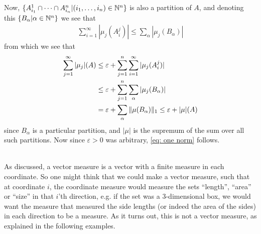 Now, $\{ A_{i_{1}}^{1} \cap \dots \cap A_{i_{n}}^{n} | (i_{1}, \dots, i_{n}) \in \N^{n} \}$ is also a partition of $A$, and denoting this $\{ B_{\alpha} | \alpha \in \N^{n} \}$ we see that
\begin{align*}
	\sum_{i=1}^{\infty} | \mu_{j} (A_{i}^{j}) | \le \sum_{\alpha} | \mu_{j} (B_{\alpha}) |
\end{align*}
from which we see that
\begin{align*}
	\sum_{j=1}^{\infty} |\mu_{j} | (A) &\le \varepsilon +  \sum_{j=1}^{n} \sum_{i=1}^{\infty} | \mu_{j}(A_{i}^{j})| \\
	&\le \varepsilon + \sum_{j=1}^{n} \sum_{\alpha} | \mu_{j}(B_{\alpha})| \\
	&= \varepsilon + \sum_{\alpha} \norm[1]{\mu (B_{\alpha})}   \le \varepsilon + |\mu|(A) \\
\end{align*}
since $B_{\alpha}$ is a particular partition, and $|\mu|$ is the supremum of the sum over all such partitions. Now since $\varepsilon>0$ was arbitrary, \eqref{eq: one norm} follows.




\text{ }\\
As discussed, a vector measure is a vector with a finite measure in each coordinate. So one might think that we could make a vector measure, such that at coordinate $i$, the coordinate measure would measure the sets ``length'', ``area'' or ``size'' in that $i$'th direction, e.g. if the set was a 3-dimensional box, we would want the measure that measured the side lengths (or indeed the area of the sides) in each direction to be a measure. As it turns out, this is not a vector measure, as explained in the following examples.

